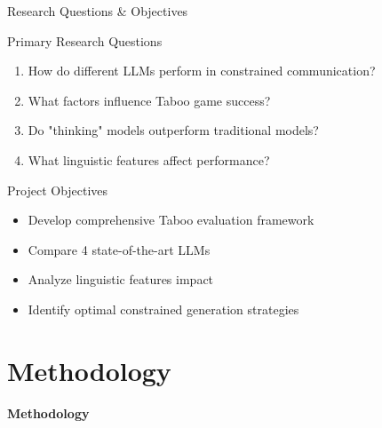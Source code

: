 \documentclass[aspectratio=169]{beamer}
\begin{document}
\begin{frame}{Research Questions \& Objectives}
\begin{block}{Primary Research Questions}
\begin{enumerate}
    \item How do different LLMs perform in constrained communication?
    \item What factors influence Taboo game success?
    \item Do "thinking" models outperform traditional models?
    \item What linguistic features affect performance?
\end{enumerate}
\end{block}

\begin{block}{Project Objectives}
\begin{itemize}
    \item Develop comprehensive Taboo evaluation framework
    \item Compare 4 state-of-the-art LLMs
    \item Analyze linguistic features impact
    \item Identify optimal constrained generation strategies
\end{itemize}
\end{block}
\end{frame}

\section{Methodology}

\begin{frame}
\begin{center}
\Huge \textbf{Methodology}
\end{center}
\end{frame}
\end{document}
